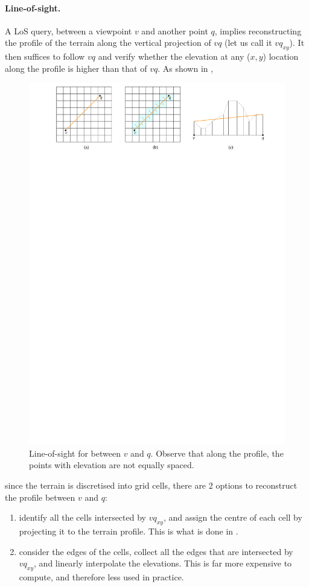 \paragraph{Line-of-sight.}
A LoS query, between a viewpoint $v$ and another point $q$, implies reconstructing the profile of the terrain along the vertical projection of $vq$ (let us call it $vq_{xy}$).
It then suffices to follow $vq$ and verify whether the elevation at any ($x,y$) location along the profile is higher than that of $vq$.
As shown in , 
\begin{figure}
  \centering
  \includegraphics[width=\linewidth]{figs/los}
  \caption{Line-of-sight for between $v$ and $q$. Observe that along the profile, the points with elevation are not equally spaced.}%
\end{figure}
since the terrain is discretised into grid cells, there are 2 options to reconstruct the profile between $v$ and $q$:
\begin{enumerate}
  \item identify all the cells intersected by $vq_{xy}$, and assign the centre of each cell by projecting it to the terrain profile. This is what is done in .
  \item consider the edges of the cells, collect all the edges that are intersected by $vq_{xy}$, and linearly interpolate the elevations. This is far more expensive to compute, and therefore less used in practice.
\end{enumerate}

